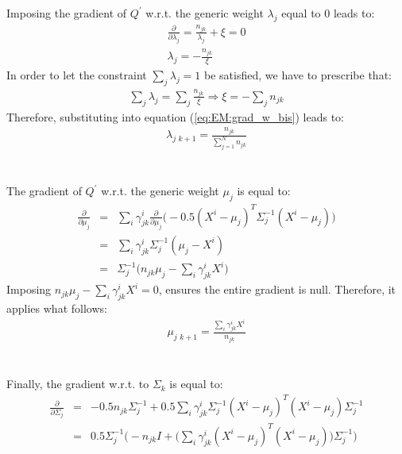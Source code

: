 \documentclass{article}
\begin{document}
\\
\\
Imposing the gradient of $Q^{'}$ w.r.t. the generic weight $\lambda_j$ equal to 0 leads to:
\begin{eqnarray}
\frac{\partial}{\partial \lambda_j} = \frac{n_{jk}}{\lambda_j} + \xi = 0 \nonumber\\
\lambda_j = - \frac{n_{jk}}{\xi}
\label{eq:EM:grad_w_bis}
\end{eqnarray}
In order to let the constraint $\sum_j \lambda_j = 1$ be satisfied, we have to prescribe that:
\begin{eqnarray}
\sum _j \lambda_j = \sum_j \frac{n_{jk}}{\xi} \Rightarrow
\xi= - \sum_j  n_{jk}
\end{eqnarray}
Therefore, substituting into equation (\ref{eq:EM:grad_w_bis}) leads to:
\begin{eqnarray}
\lambda _{j\,\,k+1} =  \frac{n_{jk}}{\sum_{j=1}^N n_{jk}}
\label{eq:EM:grad_w}
\end{eqnarray}
\\
\\
The gradient of $Q^{'}$ w.r.t. the generic weight $\mu_j$ is equal to:
\begin{eqnarray}
\frac{\partial}{\partial \mu_j}  &=& \sum_{i}  \gamma^{i}_{jk}
\frac{\partial }{\partial \mu_j} \bigg( 
-0.5 (X^i - \mu_j)^T \Sigma_j^{-1} (X^i - \mu_j)
\bigg) \nonumber\\
&=& \sum_{i}  \gamma^{i}_{jk}
\Sigma_j^{-1}(\mu_j - X^i) \nonumber\\
&=& \Sigma_j^{-1} \bigg( n_{jk} \mu_j 
- \sum_{i} \gamma^{i}_{jk} X^i
\bigg)
\end{eqnarray}
Imposing $n_{jk} \mu_j - \sum_{i} \gamma^{i}_{jk} X^i = 0$, ensures the entire gradient is null. Therefore, it applies what follows:
\begin{eqnarray}
 \mu_{j\,\,k+1} = \frac{\sum_{i} \gamma^{i}_{jk} X^i}{n_{jk}}
\label{eq:EM:grad_mu}
\end{eqnarray} 
\\
\\
Finally, the gradient w.r.t. to $\Sigma _k$ is equal to:
\begin{eqnarray}
\frac{\partial}{\partial \Sigma _j} 
&=& -0.5 n_{jk} \Sigma_j^{-1} 
+ 0.5 \sum_i \gamma^i_{jk} \Sigma_j^{-1} (X^i - \mu_j)^T(X^i - \mu_j) \Sigma_j^{-1}\nonumber\\
&=& 0.5 \Sigma_j^{-1} \bigg( - n_{jk} I 
+ \big(  \sum_i  \gamma^i_{jk} (X^i - \mu_j)^T(X^i - \mu_j) \big) \Sigma_j^{-1} \bigg)
\end{eqnarray}
\end{document}
